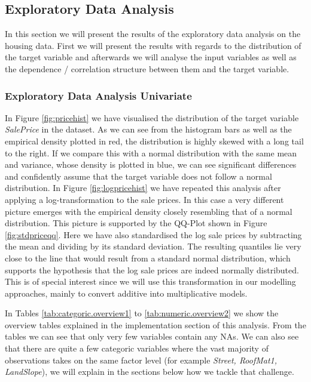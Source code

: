 \subsection{Exploratory Data Analysis}
In this section we will present the results of the exploratory data analysis on the housing data. First we will present the results with regards to the distribution of the target variable and afterwards we will analyse the input variables as well as the dependence / correlation structure between them and the target variable. 
\subsubsection{Exploratory Data Analysis Univariate}
In Figure \ref{fig:pricehist} we have visualised the distribution of the target variable \textit{SalePrice} in the dataset. As we can see from the histogram bars as well as the empirical density plotted in red, the distribution is highly skewed with a long tail to the right. If we compare this with a normal distribution with the same mean and variance, whose density is plotted in blue, we can see significant differences and confidently assume that the target variable does not follow a normal distribution. 
In Figure \ref{fig:logpricehist} we have repeated this analysis after applying a log-transformation to the sale prices. In this case a very different picture emerges with the empirical density closely resembling that of a normal distribution. This picture is supported by the QQ-Plot shown in Figure \ref{fig:stdpriceqq}. Here we have also standardised the log sale prices by subtracting the mean and dividing by its standard deviation. The resulting quantiles lie very close to the line that would result from a standard normal distribution, which supports the hypothesis that the log sale prices are indeed normally distributed. This is of special interest since we will use this transformation in our modelling approaches, mainly to convert additive into multiplicative models. 

In Tables \ref{tab:categoric.overview1} to \ref{tab:numeric.overview2} we show the overview tables explained in the implementation section of this analysis. From the tables we can see that only very few variables contain any NAs. We can also see that there are quite a few categoric variables where the vast majority of observations takes on the same factor level (for example \textit{Street, RoofMat1, LandSlope}), we will explain in the sections below how we tackle that challenge.

